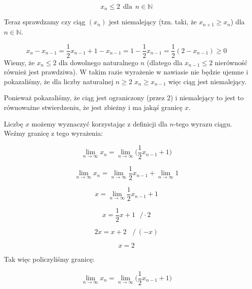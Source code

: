 \documentclass[a4paper,oneside,openright,11pt]{article}
\numberwithin{equation}{section}
\begin{document}
    \begin{equation*}
        x_{n} \leq 2 \ \ \mbox{dla} \ \ n \in \mathbb{N}
    \end{equation*}


Teraz sprawdzamy czy ciąg $(x_{n})$ jest niemalejący (tzn. taki, że $x_{n+1} \geq x_{n}$) dla $n \in \mathbb{N}$.

\begin{equation*}
    x_{n} - x_{n-1} = \frac{1}{2}x_{n-1} + 1 - x_{n-1} = 1 - \frac{1}{2}x_{n-1} = \frac{1}{2}(2 - x_{n-1}) \geq 0
\end{equation*}
%
Wiemy, że $x_{n} \leq 2$ dla dowolnego naturalnego $n$ (dlatego dla $x_{n-1} \leq 2$ nierówność również jest prawdziwa).
W takim razie wyrażenie w nawiasie nie będzie ujemne i pokazaliśmy, że dla liczby naturalnej $n \geq 2$ $x_{n} \geq x_{n-1}$ więc ciąg jest niemalejący.

\begin{center}
    Ponieważ pokazaliśmy, że ciąg jest ograniczony (przez $2$) i niemalejący to jest to równoważne stwierdzeniu, że jest zbieżny i
    ma jakąś granicę $x$.
\end{center}

Liczbę $x$ możemy wyznaczyć korzystając z definicji dla $n$-tego wyrazu ciągu. Weźmy granicę z tego wyrażenia:

\begin{equation*}
    \lim_{n\to\infty} x_{n} = \lim_{n\to\infty}\Big(\frac{1}{2} x_{n - 1} + 1\Big)
\end{equation*}

\begin{equation*}
    \lim_{n\to\infty} x_{n} = \lim_{n\to\infty} \frac{1}{2}x_{n-1} +  \lim_{n\to\infty} 1
\end{equation*}

\begin{equation*}
    x = \lim_{n\to\infty} \frac{1}{2}x_{n-1} + 1
\end{equation*}

\begin{equation*}
    x = \frac{1}{2}x + 1 \ \ \ / \cdot 2
\end{equation*}

\begin{equation*}
    2x = x + 2  \ \ \ \ / \ (-x)
\end{equation*}

\begin{equation*}
    x = 2
\end{equation*}

Tak więc policzyliśmy granicę:

\begin{equation*}
    \lim_{n\to\infty} x_{n} = \lim_{n\to\infty}\Big(\frac{1}{2} x_{n - 1} + 1\Big)
\end{equation*}
\end{document}

